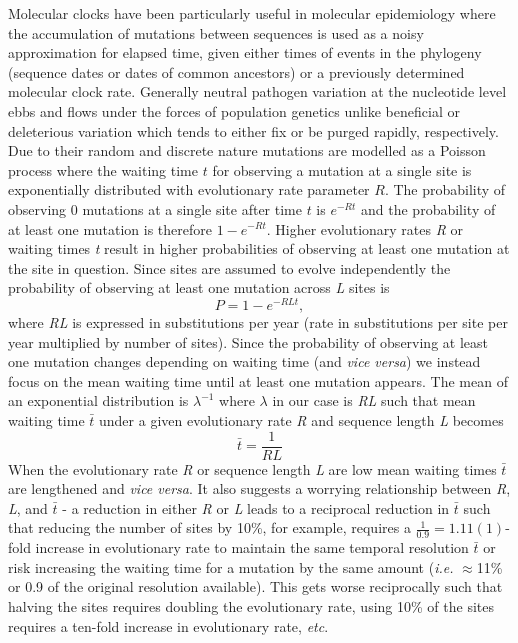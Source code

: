 \documentclass{bmcart}
\begin{document}
Molecular clocks have been particularly useful in molecular epidemiology where the accumulation of mutations between sequences is used as a noisy approximation for elapsed time, given either times of events in the phylogeny (sequence dates or dates of common ancestors) or a previously determined molecular clock rate.
Generally neutral pathogen variation at the nucleotide level ebbs and flows under the forces of population genetics unlike beneficial or deleterious variation which tends to either fix or be purged rapidly, respectively.
Due to their random and discrete nature mutations are modelled as a Poisson process \cite{yang_computational_2006} where the waiting time $t$ for observing a mutation at a single site is exponentially distributed with evolutionary rate parameter $R$.
The probability of observing 0 mutations at a single site after time $t$ is $e^{-Rt}$ and the probability of at least one mutation is therefore $1-e^{-Rt}$.
Higher evolutionary rates \textit{R} or waiting times \textit{t} result in higher probabilities of observing at least one mutation at the site in question.
Since sites are assumed to evolve independently the probability of observing at least one mutation across \textit{L} sites is
\begin{equation}
  P = 1-e^{-RLt},
\end{equation}
where \textit{RL} is expressed in substitutions per year (rate in substitutions per site per year multiplied by number of sites).
Since the probability of observing at least one mutation changes depending on waiting time (and \textit{vice versa}) we instead focus on the mean waiting time until at least one mutation appears.
The mean of an exponential distribution is $\lambda^{-1}$ where $\lambda$ in our case is \textit{RL} such that mean waiting time $\bar{t}$ under a given evolutionary rate \textit{R} and sequence length \textit{L} becomes
\begin{equation}
  \bar{t} = \frac{1}{RL}
  \label{horizon}
\end{equation}
When the evolutionary rate \textit{R} or sequence length \textit{L} are low mean waiting times $\bar{t}$ are lengthened and \textit{vice versa}.
It also suggests a worrying relationship between \textit{R}, \textit{L}, and $\bar{t}$ - a reduction in either \textit{R} or \textit{L} leads to a reciprocal reduction in $\bar{t}$ such that reducing the number of sites by 10\%, for example, requires a $\frac{1}{0.9} = 1.11(1)$-fold increase in evolutionary rate to maintain the same temporal resolution $\bar{t}$ or risk increasing the waiting time for a mutation by the same amount (\textit{i.e.} $\approx$11\% or 0.9 of the original resolution available).
This gets worse reciprocally such that halving the sites requires doubling the evolutionary rate, using 10\% of the sites requires a ten-fold increase in evolutionary rate, \textit{etc}.
\end{document}
